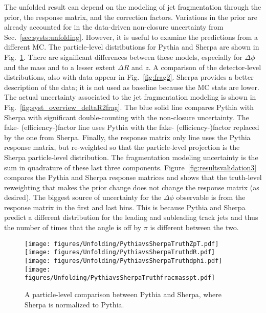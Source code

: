 The unfolded result can depend on the modeling of jet fragmentation through the prior, the response matrix, and the correction factors.  Variations in the prior are already accounted for in the data-driven non-closure uncertainty from Sec.~\ref{sec:systs:unfolding}.  However, it is useful to examine the predictions from a different MC.  The particle-level distributions for Pythia and Sherpa are shown in Fig.~\ref{fig:frag1}.  There are significant differences between these models, especially for $\Delta\phi$ and the mass and to a lesser extent $\Delta R$ and $z$.  A comparison of the detector-level distributions, also with data appear in Fig.~\ref{fig:frag2}.   Sherpa provides a better description of the data; it is not used as baseline because the MC stats are lower.  The actual uncertainty associated to the jet fragmentation modeling is shown in Fig.~\ref{fig:syst_overview_deltaR2frag}.  The blue solid line compares Pythia with Sherpa with significant double-counting with the non-closure uncertainty.  The fake- (efficiency-)factor line uses Pythia with the fake- (efficiency-)factor replaced by the one from Sherpa.  Finally, the response matrix only line uses the Pythia response matrix, but re-weighted so that the particle-level projection is the Sherpa particle-level distribution.  The fragmentation modeling uncertainty is the sum in quadrature of these last three components.  Figure~\ref{fig:resultsvalidation3} compares the Pythia and Sherpa response matrices and shows that the truth-level reweighting that makes the prior change does not change the response matrix (as desired).  The biggest source of uncertainty for the $\Delta\phi$ observable is from the response matrix in the first and last bins.  This is because Pythia and Sherpa predict a different distribution for the leading and subleading track jets and thus the number of times that the angle is off by $\pi$ is different between the two.



\begin{figure}[htpb!]
\begin{center}
\texttt{[image: figures/Unfolding/PythiavsSherpaTruthZpT.pdf]}\texttt{[image: figures/Unfolding/PythiavsSherpaTruthdR.pdf]}\\
\texttt{[image: figures/Unfolding/PythiavsSherpaTruthdphi.pdf]}\texttt{[image: figures/Unfolding/PythiavsSherpaTruthfracmasspt.pdf]}
\caption[]{A particle-level comparison between Pythia and Sherpa, where Sherpa is normalized to Pythia.} 
\label{fig:frag1}
\end{center}
\end{figure}

